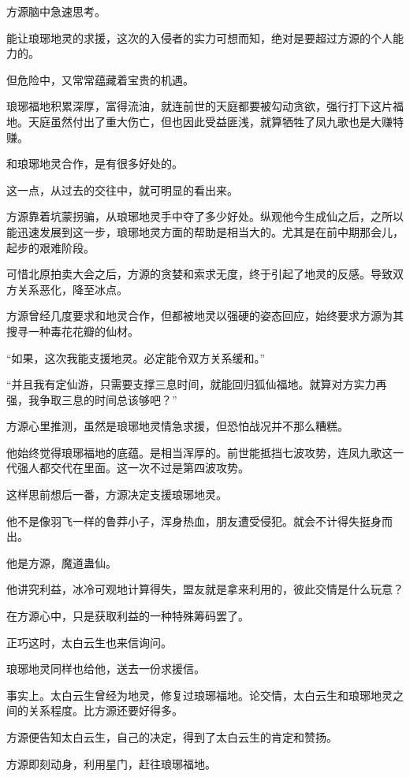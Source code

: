 \begin{this_body}
方源脑中急速思考。

能让琅琊地灵的求援，这次的入侵者的实力可想而知，绝对是要超过方源的个人能力的。

但危险中，又常常蕴藏着宝贵的机遇。

琅琊福地积累深厚，富得流油，就连前世的天庭都要被勾动贪欲，强行打下这片福地。天庭虽然付出了重大伤亡，但也因此受益匪浅，就算牺牲了凤九歌也是大赚特赚。

和琅琊地灵合作，是有很多好处的。

这一点，从过去的交往中，就可明显的看出来。

方源靠着坑蒙拐骗，从琅琊地灵手中夺了多少好处。纵观他今生成仙之后，之所以能迅速发展到这一步，琅琊地灵方面的帮助是相当大的。尤其是在前中期那会儿，起步的艰难阶段。

可惜北原拍卖大会之后，方源的贪婪和索求无度，终于引起了地灵的反感。导致双方关系恶化，降至冰点。

方源曾经几度要求和地灵合作，但都被地灵以强硬的姿态回应，始终要求方源为其搜寻一种毒花花瓣的仙材。

“如果，这次我能支援地灵。必定能令双方关系缓和。”

“并且我有定仙游，只需要支撑三息时间，就能回归狐仙福地。就算对方实力再强，我争取三息的时间总该够吧？”

方源心里推测，虽然是琅琊地灵情急求援，但恐怕战况并不那么糟糕。

他始终觉得琅琊福地的底蕴。是相当浑厚的。前世能抵挡七波攻势，连凤九歌这一代强人都交代在里面。这一次不过是第四波攻势。

这样思前想后一番，方源决定支援琅琊地灵。

他不是像羽飞一样的鲁莽小子，浑身热血，朋友遭受侵犯。就会不计得失挺身而出。

他是方源，魔道蛊仙。

他讲究利益，冰冷可观地计算得失，盟友就是拿来利用的，彼此交情是什么玩意？

在方源心中，只是获取利益的一种特殊筹码罢了。

正巧这时，太白云生也来信询问。

琅琊地灵同样也给他，送去一份求援信。

事实上。太白云生曾经为地灵，修复过琅琊福地。论交情，太白云生和琅琊地灵之间的关系程度。比方源还要好得多。

方源便告知太白云生，自己的决定，得到了太白云生的肯定和赞扬。

方源即刻动身，利用星门，赶往琅琊福地。


\end{this_body}

